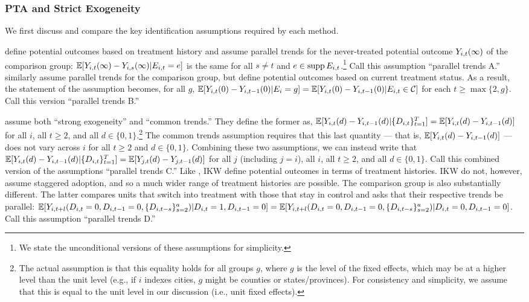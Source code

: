 \documentclass[12pt]{article}
\begin{document}
\subsubsection{PTA and Strict Exogeneity}

We first discuss and compare the key identification assumptions required by each method.

\citet{sun2021-event} define potential outcomes based on treatment history and assume parallel trends for the never-treated potential outcome $Y_{i,t}(\infty)$ of the comparison group: $\mathbb{E}[Y_{i,t}(\infty) - Y_{i,s}(\infty) | E_{i,t}=e]$ is the same for all $s\neq t$ and $e\in\mathop{\rm supp} E_{i,t}$.\footnote{We state the unconditional versions of these assumptions for simplicity.} Call this assumption ``parallel trends A.'' \citet{callaway2021-did} similarly assume parallel trends for the comparison group, but define potential outcomes based on current treatment status. As a result, the statement of the assumption becomes, for all $g$, $\mathbb{E}[Y_{i,t}(0) - Y_{i, t-1}(0)| E_i=g]=\mathbb{E}[Y_{i,t}(0)-Y_{i,t-1}(0) | E_{i,t}\in \mathcal{C}]$ for each $t \geq \max\{2, g\}$. Call this version ``parallel trends B.''



\citet{CDH2020} assume both ``strong exogeneity'' and ``common trends.'' They define the former as, $\mathbb{E}[Y_{i,t}(d)-Y_{i,t-1}(d) | \{D_{i,t}\}_{t=1}^T]=\mathbb{E}[Y_{i,t}(d)-Y_{i,t-1}(d)]$ for all $i$, all $t\geq 2$, and all $d\in\{0,1\}$.\footnote{The actual assumption is that this equality holds for all groups $g$, where $g$ is the level of the fixed effects, which may be at a higher level than the unit level (e.g., if $i$ indexes cities, $g$ might be counties or states/provinces). For consistency and simplicity, we assume that this is equal to the unit level in our discussion (i.e., unit fixed effects).} The common trends assumption requires that this last quantity --- that is, $\mathbb{E}[Y_{i,t}(d)-Y_{i,t-1}(d)]$ --- does not vary across $i$ for all $t\geq 2$ and $d\in\{0,1\}$. Combining these two assumptions, we can instead write that $\mathbb{E}[Y_{i,t}(d)-Y_{i,t-1}(d) | \{D_{i,t}\}_{t=1}^T] = \mathbb{E}[Y_{j,t}(d) - Y_{j,t-1}(d)]$ for all $j$ (including $j=i$), all $i$, all $t\geq 2$, and all $d\in\{0,1\}$. Call this combined version of the assumptions ``parallel trends C.'' Like \citet{sun2021-event}, IKW \citeyearpar{IKW2021} define potential outcomes in terms of treatment histories. IKW \citeyearpar{IKW2021} do not, however, assume staggered adoption, and so a much wider range of treatment histories are possible. The comparison group is also substantially different. The latter compares units that switch into treatment with those that stay in control and asks that their respective trends be parallel: $\mathbb{E}[Y_{i,t+l}(D_{i,t}=0, D_{i,t-1}=0, \{D_{i,t-s}\}_{s=2}^a)|D_{i,t}=1,D_{i,t-1}=0]=\mathbb{E}[Y_{i,t+l}(D_{i,t}=0, D_{i,t-1}=0, \{D_{i,t-s}\}_{s=2}^a)|D_{i,t}=0,D_{i,t-1}=0]$. Call this assumption ``parallel trends D.'' 
\end{document}
